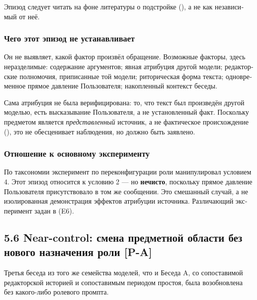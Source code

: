 \begin{russian}
Эпизод следует читать на фоне литературы о подстройке (), а не как независимый от неё.


\subsubsection*{Чего этот эпизод не устанавливает}
\label{sec:ru:x--8}

Он не выявляет, какой фактор произвёл обращение. Возможные факторы, здесь неразделимые: содержание аргументов; явная атрибуция другой модели; редакторские полномочия, приписанные той модели; риторическая форма текста; одновременное прямое давление Пользователя; накопленный контекст беседы.

Сама атрибуция не была верифицирована: то, что текст был произведён другой моделью, есть высказывание Пользователя, а не установленный факт. Поскольку предметом является \emph{представленный} источник, а не фактическое происхождение (), это не обесценивает наблюдения, но должно быть заявлено.


\subsubsection*{Отношение к основному эксперименту}
\label{sec:ru:x--9}

По таксономии  эксперимент по переконфигурации роли манипулировал условием 4. Этот эпизод относится к условию 2 — но \textbf{нечисто}, поскольку прямое давление Пользователя присутствовало в том же сообщении. Это смешанный случай, а не изолированная демонстрация эффектов атрибуции источника. Различающий эксперимент задан в  (E6).


\subsection*{5.6 Near-control: смена предметной области без нового назначения роли \textbf{[P-A]}}
\label{sec:ru:5.6}

Третья беседа из того же семейства моделей, что и Беседа A, со сопоставимой редакторской историей и сопоставимым периодом простоя, была возобновлена без какого-либо ролевого промпта.


\end{russian}
